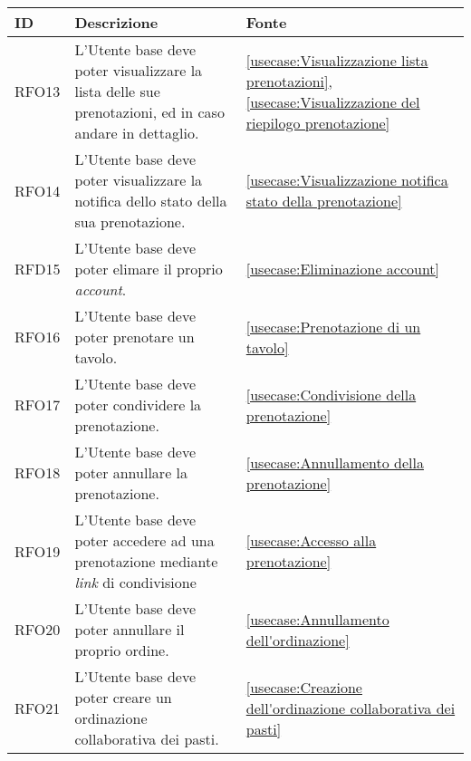 \begin{table}[H]
	\renewcommand{\arraystretch}{1.5}
	\centering
	\begin{tabularx}{\textwidth}{l|X|p{2cm}}
		\textbf{ID} & \textbf{Descrizione}                                                                                           & \textbf{Fonte}                                                              \\
		\hline
		RFO13       & L'Utente base deve poter visualizzare la lista delle sue prenotazioni, ed in caso andare in dettaglio.          & \autoref{usecase:Visualizzazione lista prenotazioni}, \autoref{usecase:Visualizzazione del riepilogo prenotazione}                \\
		\hline
		RFO14       & L'Utente base deve poter visualizzare la notifica dello stato della sua prenotazione.                          & \autoref{usecase:Visualizzazione notifica stato della prenotazione}         \\
		\hline
		RFD15       & L'Utente base deve poter elimare il proprio \textit{account}.                                                           & \autoref{usecase:Eliminazione account}                                      \\
		\hline
		RFO16       & L'Utente base deve poter prenotare un tavolo.                                                                  & \autoref{usecase:Prenotazione di un tavolo}                                 \\
		\hline
		RFO17       & L'Utente base deve poter condividere la prenotazione.                                                          & \autoref{usecase:Condivisione della prenotazione}                           \\
		\hline
		RFO18       & L'Utente base deve poter annullare la prenotazione.                                                            & \autoref{usecase:Annullamento della prenotazione}                           \\
		\hline
		RFO19       & L'Utente base deve poter accedere ad una prenotazione mediante \textit{link} di condivisione                            & \autoref{usecase:Accesso alla prenotazione}                                 \\
		\hline
		RFO20       & L'Utente base deve poter annullare il proprio ordine.                                                          & \autoref{usecase:Annullamento dell'ordinazione}                             \\
		\hline
		RFO21       & L'Utente base deve poter creare un ordinazione collaborativa dei pasti.                                        & \autoref{usecase:Creazione dell'ordinazione collaborativa dei pasti}        \\

\end{tabularx}
\end{table}
